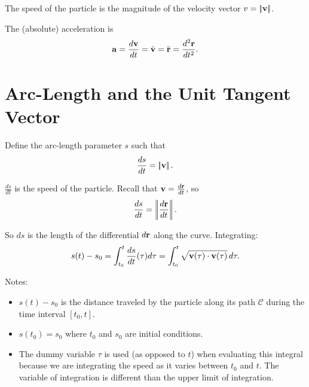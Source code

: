 \documentclass[
  letterpaper,
  DIV=11,
  numbers=noendperiod]{scrreprt}
\providecommand{\tightlist}{%
  \setlength{\itemsep}{0pt}\setlength{\parskip}{0pt}}
\newcommand{\lnorm}{\left|\!\left|}
\newcommand{\rnorm}{\right|\!\right|}
\begin{document}
The speed of the particle is the magnitude of the velocity vector
\(v = \lnorm{\bf v}\rnorm\).

The (absolute) acceleration is \begin{align}
    {\bf a} = \frac{d{\bf v}}{dt} = \dot{\bf v} = \ddot{\bf r} = \frac{d^2{\bf r}}{dt^2}.
\end{align}

\section{Arc-Length and the Unit Tangent
Vector}\label{arc-length-and-the-unit-tangent-vector}

Define the arc-length parameter \(s\) such that \begin{align}
    \frac{ds}{dt} = \lnorm {\bf v}\rnorm.
\end{align}

\(\frac{ds}{dt}\) is the speed of the particle. Recall that
\({\bf v} = \frac{d{\bf r}}{dt}\), so \begin{align}
    \frac{ds}{dt} = \lnorm\frac{d{\bf r}}{dt}\rnorm.
\end{align}

So \(ds\) is the length of the differential \(d{\bf r}\) along the
curve. Integrating: \begin{align}
    s(t)-s_0 = \int_{t_0}^t\frac{ds}{dt}(\tau)d\tau = \int_{t_0}^t\sqrt{{\bf v}(\tau)\cdot{\bf v}(\tau)}\,d\tau.
\end{align}

Notes:

\begin{itemize}
\tightlist
\item
  \(s(t)-s_0\) is the distance traveled by the particle along its path
  \(\mathcal{C}\) during the time interval \([t_0, t]\).
\item
  \(s(t_0)=s_0\) where \(t_0\) and \(s_0\) are initial conditions.
\item
  The dummy variable \(\tau\) is used (as opposed to \(t\)) when
  evaluating this integral because we are integrating the speed as it
  varies between \(t_0\) and \(t\). The variable of integration is
  different than the upper limit of integration.
\end{itemize}
\end{document}
